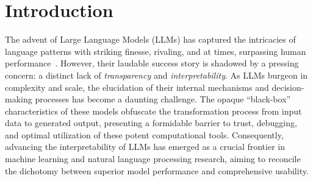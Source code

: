 \documentclass[letterpaper]{article} %
\begin{document}
\section{Introduction}

The advent of Large Language Models (LLMs) has captured the intricacies of language patterns with striking finesse, rivaling, and at times, surpassing human performance~\citep{zhou2022large,openai2023gpt4}. However, their laudable success story is shadowed by a pressing concern: a distinct lack of \textit{transparency} and \textit{interpretability}. As LLMs burgeon in complexity and scale, the elucidation of their internal mechanisms and decision-making processes has become a daunting challenge. The opaque ``black-box'' characteristics of these models obfuscate the transformation process from input data to generated output, presenting a formidable barrier to trust, debugging, and optimal utilization of these potent computational tools. Consequently, advancing the interpretability of LLMs has emerged as a crucial frontier in machine learning and natural language processing research, aiming to reconcile the dichotomy between superior model performance and comprehensive usability.
\end{document}
